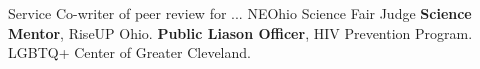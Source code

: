\begin{rubric}{Service}
\entry* Co-writer of peer review for ...  
\entry*[2022] NEOhio Science Fair Judge
\entry*[2023] \textbf{Science Mentor}, RiseUP Ohio.
%
\entry*[2023] \textbf{Public Liason Officer}, HIV Prevention Program. LGBTQ+ Center of Greater Cleveland.
\end{rubric}